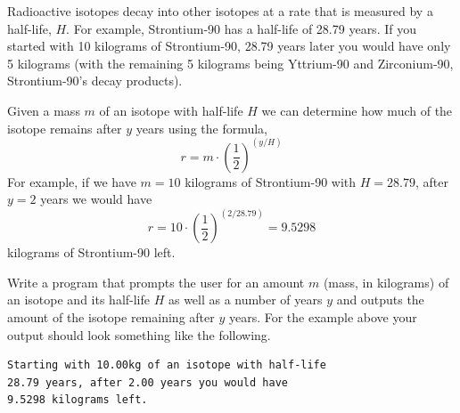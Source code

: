 \begin{exer}
Radioactive isotopes decay into other isotopes at a rate that is
measured by a half-life, $H$.  For example, Strontium-90 has a half-life
of 28.79 years.  If you started with 10 kilograms of Strontium-90, 28.79
years later you would have only 5 kilograms (with the remaining 5 kilograms
being Yttrium-90 and Zirconium-90, Strontium-90's decay products).

Given a mass $m$ of an isotope with half-life $H$ we can determine
how much of the isotope remains after $y$ years using the formula,
  $$r = m \cdot \left(\frac{1}{2}\right)^{(y/H)}$$
For example, if we have $m = 10$ kilograms of Strontium-90 with $H = 28.79$, 
after $y = 2$ years we would have 
  $$r = 10 \cdot \left(\frac{1}{2}\right)^{(2/28.79)} = 9.5298$$
kilograms of Strontium-90 left.

Write a program that prompts the user for an amount $m$ (mass, in kilograms) 
of an isotope and its half-life $H$ as well as a number of years $y$ and 
outputs the amount of the isotope remaining after $y$ years.  For the
example above your output should look something like the following.

\begin{verbatim}
Starting with 10.00kg of an isotope with half-life
28.79 years, after 2.00 years you would have
9.5298 kilograms left.
\end{verbatim}
\end{exer}

